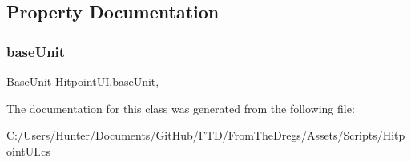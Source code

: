 \subsection{Property Documentation}
\mbox{\label{class_hitpoint_u_i_a6dfd0f75896f8f70dc7f2dc0ff34fb42}} 
\subsubsection{\texorpdfstring{baseUnit}{baseUnit}}
{\footnotesize\ttfamily \mbox{\hyperlink{class_base_unit}{Base\+Unit}} Hitpoint\+U\+I.\+base\+Unit\hspace{0.3cm}{\ttfamily [get]}, {\ttfamily [set]}}



The documentation for this class was generated from the following file\+:\begin{DoxyCompactItemize}
\item 
C\+:/\+Users/\+Hunter/\+Documents/\+Git\+Hub/\+F\+T\+D/\+From\+The\+Dregs/\+Assets/\+Scripts/Hitpoint\+U\+I.\+cs\end{DoxyCompactItemize}
